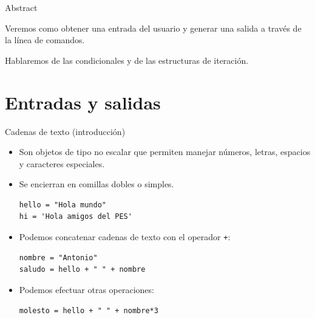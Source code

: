 \documentclass[mathserif]{beamer}
\subtitle{\bfseries%
  {Control de flujo e iteraciones}\\%
}
\begin{document}


\begin{frame}{Abstract}
    
    
    

	\begin{blurb}
		Veremos como obtener una entrada del usuario y generar una salida a través de la línea de comandos.
		
		Hablaremos de las condicionales y de las estructuras de iteración.
	\end{blurb}
\end{frame}

\section{Entradas y salidas}

\begin{frame}[fragile]{Cadenas de texto (introducción)}
    \begin{itemize}
        \item Son objetos de tipo {\blue no escalar} que permiten manejar {\orange números, letras, espacios y caracteres especiales}.
        \item Se encierran en {\blue comillas} dobles o simples.
\begin{lstlisting}
hello = "Hola mundo"
hi = 'Hola amigos del PES'        
\end{lstlisting}
        
        \item Podemos {\blue concatenar} cadenas de texto con el operador \lstinline|+|:
\begin{lstlisting}
nombre = "Antonio"
saludo = hello + " " + nombre
\end{lstlisting}
        
        \item Podemos efectuar otras operaciones: 
\begin{lstlisting}
molesto = hello + " " + nombre*3
\end{lstlisting}
    \end{itemize} 
\end{frame}
\end{document}
